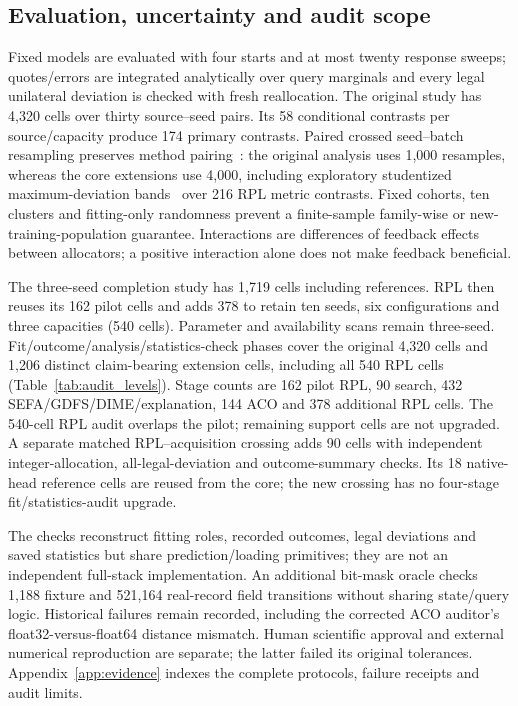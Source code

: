 \documentclass[11pt]{article}
\begin{document}
\subsection{Evaluation, uncertainty and audit scope}
Fixed models are evaluated with four starts and at most twenty response sweeps;
quotes/errors are integrated analytically over query marginals and every legal
unilateral deviation is checked with fresh reallocation. The original study
has 4,320 cells over thirty source--seed pairs. Its 58 conditional contrasts
per source/capacity produce 174 primary contrasts. Paired crossed seed--batch
resampling preserves method pairing~\cite{pigeonhole}: the original analysis
uses 1,000 resamples, whereas the core extensions use 4,000, including
exploratory studentized maximum-deviation bands~\cite{romanowolf} over 216
RPL metric contrasts. Fixed cohorts, ten clusters and fitting-only randomness
prevent a finite-sample family-wise or new-training-population guarantee.
Interactions are differences of feedback effects between allocators; a positive
interaction alone does not make feedback beneficial.

The three-seed completion study has 1,719 cells including references. RPL then
reuses its 162 pilot cells and adds 378 to retain ten seeds, six configurations
and three capacities (540 cells). Parameter and availability scans remain
three-seed. Fit/outcome/analysis/statistics-check phases cover the original
4,320 cells and 1,206 distinct claim-bearing extension cells, including all
540 RPL cells (Table~\ref{tab:audit_levels}). Stage counts are 162 pilot RPL, 90 search, 432 SEFA/GDFS/DIME/explanation,
144 ACO and 378 additional RPL cells. The 540-cell RPL audit overlaps the
pilot; remaining support cells are not upgraded. A separate matched
RPL--acquisition crossing adds 90 cells with independent integer-allocation,
all-legal-deviation and outcome-summary checks. Its 18 native-head reference
cells are reused from the core; the new crossing has no four-stage
fit/statistics-audit upgrade.

The checks reconstruct fitting roles, recorded outcomes, legal deviations
and saved statistics but share prediction/loading primitives; they are not
an independent full-stack implementation. An additional bit-mask oracle
checks 1,188 fixture and 521,164 real-record field transitions without sharing
state/query logic. Historical failures remain recorded, including the corrected
ACO auditor's float32-versus-float64 distance mismatch. Human scientific
approval and external numerical reproduction are separate; the latter failed
its original tolerances. Appendix~\ref{app:evidence} indexes the complete
protocols, failure receipts and audit limits.
\end{document}
